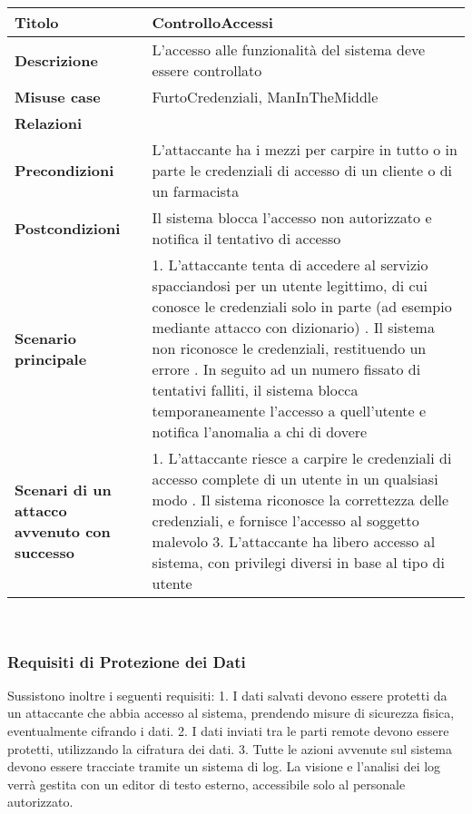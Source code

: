 \begin{tabular} {|P{4cm}|P{13cm}|}
\hline
  \textbf{Titolo} & ControlloAccessi\\
\hline
  \textbf{Descrizione} & L'accesso alle funzionalità del sistema deve essere controllato\\
\hline
  \textbf{Misuse case} & FurtoCredenziali, ManInTheMiddle\\
\hline
  \textbf{Relazioni} &\\
\hline
  \textbf{Precondizioni} & L'attaccante ha i mezzi per carpire in tutto o in parte le credenziali di accesso di un cliente o di un farmacista\\
\hline
  \textbf{Postcondizioni} & Il sistema blocca l'accesso non autorizzato e notifica il tentativo di accesso\\
\hline
  \textbf{Scenario principale} & 1. L'attaccante tenta di accedere al servizio spacciandosi per un utente legittimo, di cui conosce le credenziali solo in parte (ad esempio mediante attacco con dizionario) . Il sistema non riconosce le credenziali, restituendo un errore . In seguito ad un numero fissato di tentativi falliti, il sistema blocca temporaneamente l'accesso a quell'utente e notifica l'anomalia a chi di dovere\\
\hline
  \textbf{Scenari di un attacco avvenuto con successo} & 1. L'attaccante riesce a carpire le credenziali di accesso complete di un utente in un qualsiasi modo . Il sistema riconosce la correttezza delle credenziali, e fornisce l'accesso al soggetto malevolo 3. L'attaccante ha libero accesso al sistema, con privilegi diversi in base al tipo di utente\\
\hline
\end{tabular}
\\

\subsubsection{Requisiti di Protezione dei Dati}

Sussistono inoltre i seguenti requisiti: 1. I dati salvati devono essere
protetti da un attaccante che abbia accesso al sistema, prendendo misure
di sicurezza fisica, eventualmente cifrando i dati. 2. I dati inviati
tra le parti remote devono essere protetti, utilizzando la cifratura dei
dati. 3. Tutte le azioni avvenute sul sistema devono essere tracciate
tramite un sistema di log. La visione e l'analisi dei log verrà gestita
con un editor di testo esterno, accessibile solo al personale
autorizzato.
\\

